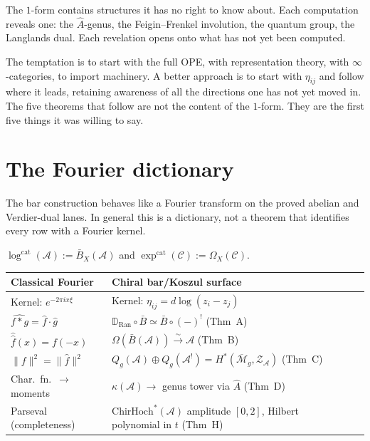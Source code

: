 \documentclass[11pt]{article}
\newcommand{\cA}{\mathcal{A}}
\newcommand{\cC}{\mathcal{C}}
\newcommand{\cM}{\mathcal{M}}
\newcommand{\cZ}{\mathcal{Z}}
\newcommand{\B}{\bar{B}}
\newcommand{\Ran}{\operatorname{Ran}}
\newcommand{\ChirHoch}{\mathrm{ChirHoch}}
\begin{document}
The $1$-form contains structures it has no right to know about.
Each computation reveals one: the $\hat{A}$-genus, the
Feigin--Frenkel involution, the quantum group, the Langlands dual.
Each revelation opens onto what has not yet been computed.

The temptation is to start with the full OPE, with representation
theory, with $\infty$-categories, to import machinery.  A better
approach is to start with $\eta_{ij}$ and follow where it leads,
retaining awareness of all the directions one has not yet moved in.
The five theorems that follow are not the content of the $1$-form.
They are the first five things it was willing to say.


\section{The Fourier dictionary}
\label{sec:fourier}

The bar construction behaves like a Fourier transform on the
proved abelian and Verdier-dual lanes.  In general this is a
dictionary, not a theorem that identifies every row with a
Fourier kernel.

\begin{definition}\label{def:cat-log}
$\log^{\mathrm{cat}}(\cA) := \B_X(\cA)$ and
$\exp^{\mathrm{cat}}(\cC) := \Omega_X(\cC)$.
\end{definition}

\begin{center}
\small
\begin{tabular}{@{}lll@{}}
\textbf{Classical Fourier} & \textbf{Chiral bar/Koszul surface} \\
\hline
Kernel: $e^{-2\pi i x\xi}$
  & Kernel: $\eta_{ij} = d\log(z_i - z_j)$ \\[3pt]
$\widehat{f * g} = \hat{f} \cdot \hat{g}$
  & $\mathbb{D}_{\Ran} \circ \B \simeq \B \circ (-)^!$
  \quad(Thm~A) \\[3pt]
$\hat{\hat{f}}(x) = f(-x)$
  & $\Omega(\B(\cA)) \xrightarrow{\sim} \cA$
  \quad(Thm~B) \\[3pt]
$\|f\|^2 = \|\hat{f}\|^2$
  & $Q_g(\cA) \oplus Q_g(\cA^!) = H^*(\overline{\cM}_g, \cZ_\cA)$
  \quad(Thm~C) \\[3pt]
Char.\ fn.\ $\to$ moments
  & $\kappa(\cA) \to$ genus tower via $\hat{A}$
  \quad(Thm~D) \\[3pt]
Parseval (completeness)
  & $\ChirHoch^*(\cA)$ amplitude $[0,2]$, Hilbert polynomial in $t$
  \quad(Thm~H)
\end{tabular}
\end{center}
\end{document}
